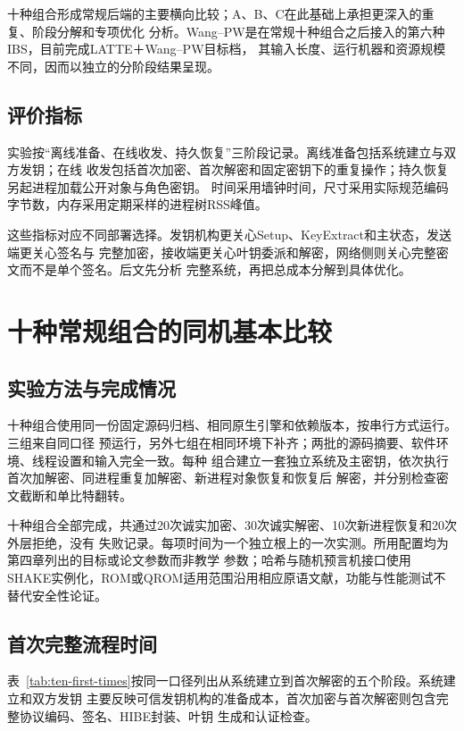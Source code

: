 十种组合形成常规后端的主要横向比较；A、B、C在此基础上承担更深入的重复、阶段分解和专项优化
分析。Wang--PW是在常规十种组合之后接入的第六种IBS，目前完成LATTE＋Wang--PW目标档，
其输入长度、运行机器和资源规模不同，因而以独立的分阶段结果呈现。

\subsection{评价指标}

实验按“离线准备、在线收发、持久恢复”三阶段记录。离线准备包括系统建立与双方发钥；在线
收发包括首次加密、首次解密和固定密钥下的重复操作；持久恢复另起进程加载公开对象与角色密钥。
时间采用墙钟时间，尺寸采用实际规范编码字节数，内存采用定期采样的进程树RSS峰值。

这些指标对应不同部署选择。发钥机构更关心Setup、KeyExtract和主状态，发送端更关心签名与
完整加密，接收端更关心叶钥委派和解密，网络侧则关心完整密文而不是单个签名。后文先分析
完整系统，再把总成本分解到具体优化。

\section{十种常规组合的同机基本比较}

\subsection{实验方法与完成情况}

十种组合使用同一份固定源码归档、相同原生引擎和依赖版本，按串行方式运行。三组来自同口径
预运行，另外七组在相同环境下补齐；两批的源码摘要、软件环境、线程设置和输入完全一致。每种
组合建立一套独立系统及主密钥，依次执行首次加解密、同进程重复加解密、新进程对象恢复和恢复后
解密，并分别检查密文截断和单比特翻转。

十种组合全部完成，共通过20次诚实加密、30次诚实解密、10次新进程恢复和20次外层拒绝，没有
失败记录。每项时间为一个独立根上的一次实测。所用配置均为第四章列出的目标或论文参数而非教学
参数；哈希与随机预言机接口使用
SHAKE实例化，ROM或QROM适用范围沿用相应原语文献，功能与性能测试不替代安全性论证。

\subsection{首次完整流程时间}

表~\ref{tab:ten-first-times}按同一口径列出从系统建立到首次解密的五个阶段。系统建立和双方发钥
主要反映可信发钥机构的准备成本，首次加密与首次解密则包含完整协议编码、签名、HIBE封装、叶钥
生成和认证检查。

